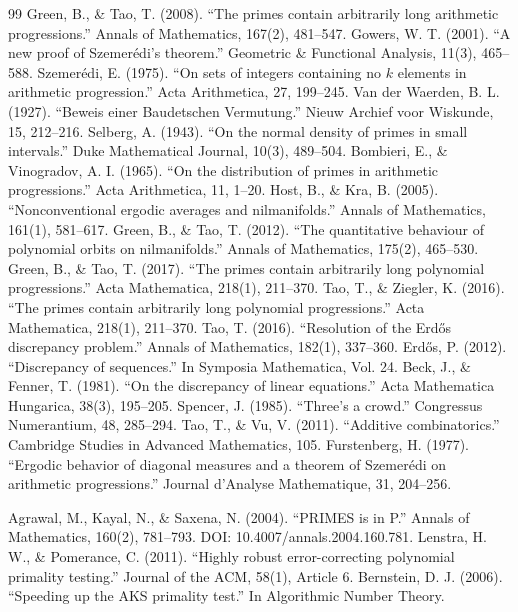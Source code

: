\begin{thebibliography}{99}
 Green, B., \& Tao, T. (2008). ``The primes contain arbitrarily long arithmetic progressions.'' Annals of Mathematics, 167(2), 481--547.
 Gowers, W. T. (2001). ``A new proof of Szemer\'edi's theorem.'' Geometric \& Functional Analysis, 11(3), 465--588.
 Szemer\'edi, E. (1975). ``On sets of integers containing no $k$ elements in arithmetic progression.'' Acta Arithmetica, 27, 199--245.
 Van der Waerden, B. L. (1927). ``Beweis einer Baudetschen Vermutung.'' Nieuw Archief voor Wiskunde, 15, 212--216.
 Selberg, A. (1943). ``On the normal density of primes in small intervals.'' Duke Mathematical Journal, 10(3), 489--504.
 Bombieri, E., \& Vinogradov, A. I. (1965). ``On the distribution of primes in arithmetic progressions.'' Acta Arithmetica, 11, 1--20.
 Host, B., \& Kra, B. (2005). ``Nonconventional ergodic averages and nilmanifolds.'' Annals of Mathematics, 161(1), 581--617.
 Green, B., \& Tao, T. (2012). ``The quantitative behaviour of polynomial orbits on nilmanifolds.'' Annals of Mathematics, 175(2), 465--530.
 Green, B., \& Tao, T. (2017). ``The primes contain arbitrarily long polynomial progressions.'' Acta Mathematica, 218(1), 211--370.
 Tao, T., \& Ziegler, K. (2016). ``The primes contain arbitrarily long polynomial progressions.'' Acta Mathematica, 218(1), 211--370.
 Tao, T. (2016). ``Resolution of the Erdős discrepancy problem.'' Annals of Mathematics, 182(1), 337--360.
 Erdős, P. (2012). ``Discrepancy of sequences.'' In Symposia Mathematica, Vol. 24.
 Beck, J., \& Fenner, T. (1981). ``On the discrepancy of linear equations.'' Acta Mathematica Hungarica, 38(3), 195--205.
 Spencer, J. (1985). ``Three's a crowd.'' Congressus Numerantium, 48, 285--294.
 Tao, T., \& Vu, V. (2011). ``Additive combinatorics.'' Cambridge Studies in Advanced Mathematics, 105.
 Furstenberg, H. (1977). ``Ergodic behavior of diagonal measures and a theorem of Szemer\'edi on arithmetic progressions.'' Journal d'Analyse Mathematique, 31, 204--256.

 Agrawal, M., Kayal, N., \& Saxena, N. (2004). ``PRIMES is in P.'' Annals of Mathematics, 160(2), 781--793. DOI: 10.4007/annals.2004.160.781.
 Lenstra, H. W., \& Pomerance, C. (2011). ``Highly robust error-correcting polynomial primality testing.'' Journal of the ACM, 58(1), Article 6.
 Bernstein, D. J. (2006). ``Speeding up the AKS primality test.'' In Algorithmic Number Theory.


\end{thebibliography}
